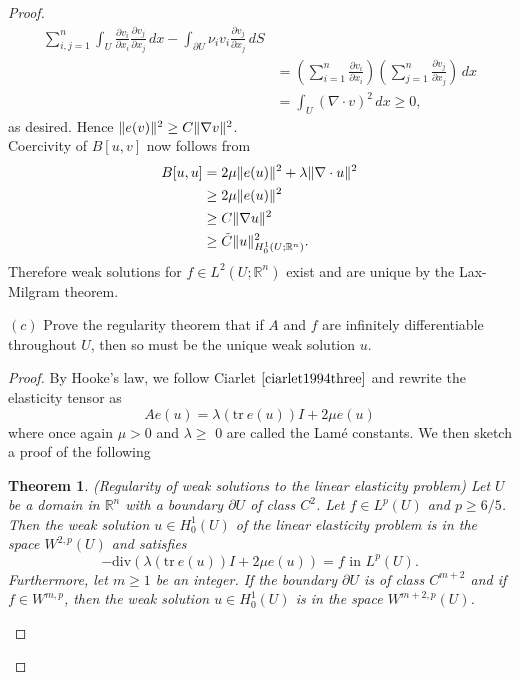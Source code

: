 \documentclass{article}
\DeclarePairedDelimiter{\norm}{\lVert}{\rVert}
\newtheorem{theorem}{Theorem}
\begin{document}
\begin{flushleft}
\begin{proof}
\begin{align*}
 \sum_{i,j=1}^n\int_U \frac{\partial v_i}{\partial x_i}\frac{\partial v_j}{\partial x_j}\,dx - \int_{\partial U} \nu_i v_i \frac{\partial v_j}{\partial x_j}\,dS \\&=
 \left(\sum_{i=1}^n \frac{\partial v_i}{\partial x_i}\right)\left(\sum_{j=1}^n \frac{\partial v_j}{\partial x_j}\right)\,dx
 \\&= \int_U (\nabla \cdot v)^2\,dx \ge 0,
\end{align*}
as desired. Hence $\norm{e(v)}^2 \ge C \norm{\nabla v}^2$.
\bigskip
\\
Coercivity of $B[u,v]$ now follows from
\begin{align*}
    B[u,u] &= 2\mu \norm{e(u)}^2+\lambda \norm{\nabla\cdot u}^2 \\&\ge
    2\mu \norm{e(u)}^2 \\&\ge
    C \norm{\nabla u}^2 \\& \ge
    \tilde{C}\norm{u}_{H_0^1(U;\mathbb R^n)}^2.
\end{align*}
Therefore weak solutions for $f\in L^2(U;\mathbb R^n)$ exist and are unique by the Lax-Milgram theorem.

$(c)$ Prove the regularity theorem that if $A$ and $f$ are infinitely differentiable throughout $U$, then so must be the unique weak solution $u$.

\begin{proof}
By Hooke's law, we follow Ciarlet $\cite{ciarlet1994three}$ and rewrite the elasticity tensor as
\begin{equation}Ae(u)=\lambda(\text{tr}~e(u))I+2\mu e(u)\end{equation}
where once again $\mu > 0$ and $\lambda\ge$ 0 are called the Lamé constants. We then sketch a proof of the following
\begin{theorem}{(Regularity of weak solutions to the linear elasticity problem)}
Let $U$ be a domain in $\mathbb R^n$ with a boundary $\partial U$ of class $C^2$. Let $f\in L^p(U)$ and $p\ge 6/5$. Then the weak solution $u\in H_0^1(U)$ of the linear elasticity problem is in the space $W^{2,p}(U)$ and satisfies
$$-\text{div}\left(\lambda(\text{tr}~e(u))I+2\mu e(u)\right)=f \text{ in $L^p(U).$}$$
Furthermore, let $m\ge 1$ be an integer. If the boundary $\partial U$ is of class $C^{m+2}$ and if $f\in W^{m,p}$, then the weak solution $u\in H_0^1(U)$ is in the space $W^{m+2,p}(U)$.
\end{theorem}


\end{proof}
\end{proof}
\end{flushleft}
\end{document}
